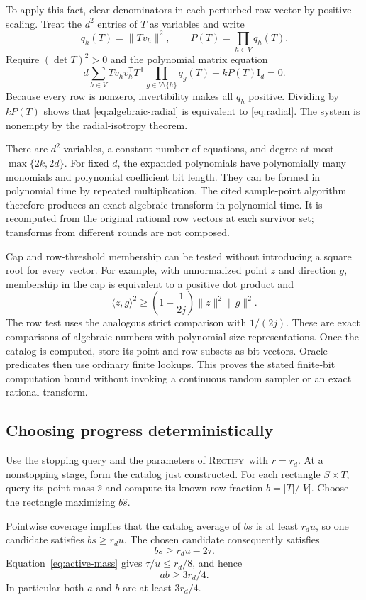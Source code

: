 \documentclass[11pt,letterpaper,pmlr,twoside]{jmlr}
\newcommand{\ip}[2]{\langle #1,#2\rangle}
\newcommand{\norm}[1]{\lVert #1\rVert}
\newcommand{\Rectify}{\textsc{Rectify}}
\newcommand{\Id}{\mathrm I}
\begin{document}
To apply this fact, clear denominators in each perturbed row vector by positive scaling. Treat the $d^2$ entries of $T$ as variables and write
\[
 q_h(T)=\norm{Tv_h}^2,\qquad P(T)=\prod_{h\in V}q_h(T).
\]
Require $(\det T)^2>0$ and the polynomial matrix equation
\begin{equation}
 d\sum_{h\in V}Tv_hv_h^{\mathsf T}T^{\mathsf T}
       \prod_{g\in V\setminus\{h\}}q_g(T)
       -kP(T)\Id_d=0.
\label{eq:algebraic-radial}
\end{equation}
Because every row is nonzero, invertibility makes all $q_h$ positive. Dividing by $kP(T)$ shows that \eqref{eq:algebraic-radial} is equivalent to \eqref{eq:radial}. The system is nonempty by the radial-isotropy theorem.

There are $d^2$ variables, a constant number of equations, and degree at most $\max\{2k,2d\}$. For fixed $d$, the expanded polynomials have polynomially many monomials and polynomial coefficient bit length. They can be formed in polynomial time by repeated multiplication. The cited sample-point algorithm therefore produces an exact algebraic transform in polynomial time. It is recomputed from the original rational row vectors at each survivor set; transforms from different rounds are not composed.

Cap and row-threshold membership can be tested without introducing a square root for every vector. For example, with unnormalized point $z$ and direction $g$, membership in the cap is equivalent to a positive dot product and
\[
 \ip{z}{g}^2\ge\left(1-\frac1{2j}\right)\norm z^2\norm g^2.
\]
The row test uses the analogous strict comparison with $1/(2j)$. These are exact comparisons of algebraic numbers with polynomial-size representations. Once the catalog is computed, store its point and row subsets as bit vectors. Oracle predicates then use ordinary finite lookups. This proves the stated finite-bit computation bound without invoking a continuous random sampler or an exact rational transform.

\subsection{Choosing progress deterministically}
Use the stopping query and the parameters of \Rectify\ with $r=r_d$. At a nonstopping stage, form the catalog just constructed. For each rectangle $S\times T$, query its point mass $\hat s$ and compute its known row fraction $b=|T|/|V|$. Choose the rectangle maximizing $b\hat s$.

Pointwise coverage implies that the catalog average of $bs$ is at least $r_du$, so one candidate satisfies $bs\ge r_du$. The chosen candidate consequently satisfies
\[
 bs\ge r_du-2\tau.
\]
Equation~\eqref{eq:active-mass} gives $\tau/u\le r_d/8$, and hence
\begin{equation}
 ab\ge3r_d/4.
\label{eq:detprogress}
\end{equation}
In particular both $a$ and $b$ are at least $3r_d/4$.
\end{document}
